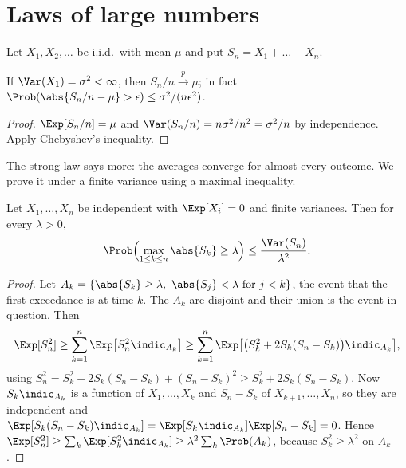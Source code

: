\section{Laws of large numbers}

Let $X_1,X_2,\dots$ be i.i.d.\ with mean $\mu$ and put $S_n=X_1+\dots+X_n$.

\begin{theorem}\label{thm:wlln}
If $\Var(X_1)=\sigma^2<\infty$, then $S_n/n\xrightarrow{p}\mu$; in fact
$\Prob(\abs{S_n/n-\mu}>\epsilon)\le\sigma^2/(n\epsilon^2)$.
\end{theorem}
\begin{proof}
$\Exp[S_n/n]=\mu$ and $\Var(S_n/n)=n\sigma^2/n^2=\sigma^2/n$ by independence. Apply
Chebyshev's inequality.
\end{proof}

The strong law says more: the averages converge for almost every outcome. We prove it
under a finite variance using a maximal inequality.

\begin{theorem}\label{thm:kolmax}
Let $X_1,\dots,X_n$ be independent with $\Exp[X_i]=0$ and finite variances. Then for
every $\lambda>0$,
\[
\Prob\Bigl(\max_{1\le k\le n}\abs{S_k}\ge\lambda\Bigr)\le\frac{\Var(S_n)}{\lambda^2}.
\]
\end{theorem}
\begin{proof}
Let $A_k=\{\abs{S_k}\ge\lambda,\ \abs{S_j}<\lambda\ \text{for }j<k\}$, the event that
the first exceedance is at time $k$. The $A_k$ are disjoint and their union is the
event in question. Then
\[
\Exp[S_n^2]\ge\sum_{k=1}^n\Exp\bigl[S_n^2\indic_{A_k}\bigr]
\ge\sum_{k=1}^n\Exp\bigl[\bigl(S_k^2+2S_k(S_n-S_k)\bigr)\indic_{A_k}\bigr],
\]
using $S_n^2=S_k^2+2S_k(S_n-S_k)+(S_n-S_k)^2\ge S_k^2+2S_k(S_n-S_k)$. Now
$S_k\indic_{A_k}$ is a function of $X_1,\dots,X_k$ and $S_n-S_k$ of
$X_{k+1},\dots,X_n$, so they are independent and
$\Exp[S_k(S_n-S_k)\indic_{A_k}]=\Exp[S_k\indic_{A_k}]\Exp[S_n-S_k]=0$. Hence
$\Exp[S_n^2]\ge\sum_k\Exp[S_k^2\indic_{A_k}]\ge\lambda^2\sum_k\Prob(A_k)$, because
$S_k^2\ge\lambda^2$ on $A_k$.
\end{proof}

